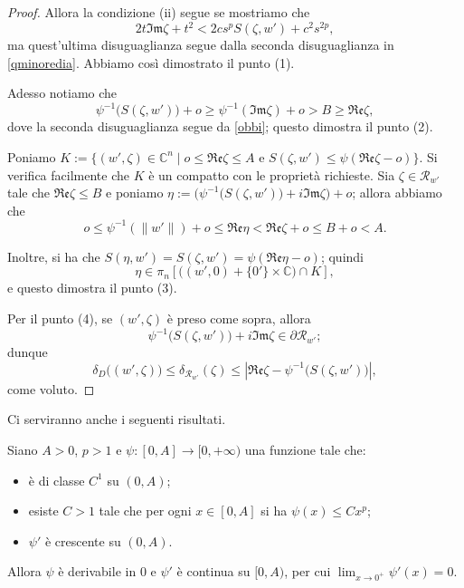 \begin{proof}
    Allora la condizione (ii) segue se mostriamo che
    $$2t\mathfrak{Im}\zeta+t^2<2cs^pS(\zeta,w')+c^2s^{2p},$$
    ma quest'ultima disuguaglianza segue dalla seconda disuguaglianza in \eqref{qminoredia}. Abbiamo così dimostrato il punto (1).

    Adesso notiamo che
    $$\psi^{-1}\big(S(\zeta,w')\big)+o \ge \psi^{-1}(\mathfrak{Im}\zeta)+o>B\ge\mathfrak{Re}\zeta,$$
    dove la seconda disuguaglianza segue da \eqref{obbi}; questo dimostra il punto (2).

    Poniamo $K:=\{(w',\zeta)\in\mathbb{C}^n\mid o\le\mathfrak{Re}\zeta\le A\text{ e }S(\zeta,w')\le\psi(\mathfrak{Re}\zeta-o)\}$. Si verifica facilmente che $K$ è un compatto con le proprietà richieste. Sia $\zeta\in\mathcal{R}_{w'}$ tale che $\mathfrak{Re}\zeta\le B$ e poniamo $\eta:=\Big(\psi^{-1}\big(S(\zeta,w')\big)+i\mathfrak{Im}\zeta\Big)+o$; allora abbiamo che
    $$o\le\psi^{-1}(\|w'\|)+o\le\mathfrak{Re}\eta<\mathfrak{Re}\zeta+o\le B+o<A.$$

    Inoltre, si ha che $S(\eta,w')=S(\zeta,w')=\psi(\mathfrak{Re}\eta-o)$; quindi
    $$\eta\in\pi_n\left[\big((w',0)+\{0'\}\times\mathbb{C}\big)\cap K\right],$$
    e questo dimostra il punto (3).

    Per il punto (4), se $(w',\zeta)$ è preso come sopra, allora
    $$\psi^{-1}\big(S(\zeta,w')\big)+i\mathfrak{Im}\zeta\in\partial\mathcal{R}_{w'};$$
    dunque
    $$\delta_D\big((w',\zeta)\big)\le \delta_{\mathcal{R}_{w'}}(\zeta)\le\left|\mathfrak{Re}\zeta-\psi^{-1}\big(S(\zeta,w')\big)\right|,$$
    come voluto.
\end{proof}

Ci serviranno anche i seguenti risultati.

\begin{lm} \label{analisibase}
    Siano $A>0$, $p>1$ e $\psi:[0,A]\longrightarrow[0,+\infty)$ una funzione tale che:
    \begin{itemize}
        \item è di classe $C^1$ su $(0,A)$;
        \item esiste $C>1$ tale che per ogni $x\in[0,A]$ si ha $\psi(x) \le Cx^{p}$;
        \item $\psi'$ è crescente su $(0,A)$.
    \end{itemize}

    Allora $\psi$ è derivabile in $0$ e $\psi'$ è continua su $[0,A)$, per cui $\displaystyle\lim_{x\longrightarrow0^+}\psi'(x)=0$.
\end{lm}

